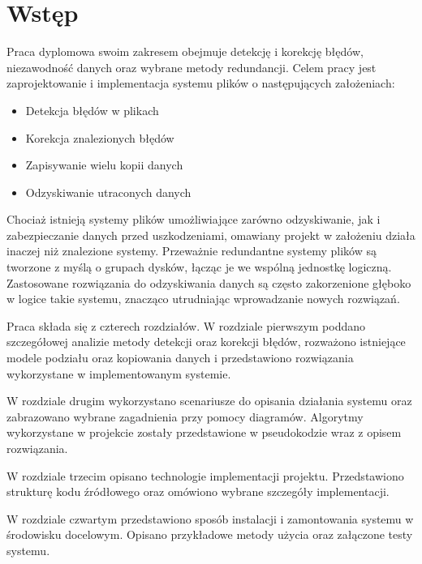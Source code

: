 \chapter{Wstęp}
\thispagestyle{chapterBeginStyle}

Praca dyplomowa swoim zakresem obejmuje detekcję i korekcję błędów, niezawodność danych oraz wybrane metody redundancji. Celem pracy jest zaprojektowanie i implementacja systemu plików o następujących założeniach:
\begin{itemize}
    \item Detekcja błędów w plikach
    \item Korekcja znalezionych błędów
    \item Zapisywanie wielu kopii danych
    \item Odzyskiwanie utraconych danych 
\end{itemize}

Chociaż istnieją systemy plików umożliwiające zarówno odzyskiwanie, jak i zabezpieczanie danych przed uszkodzeniami\cite{Java}, omawiany projekt w założeniu działa inaczej niż znalezione systemy. Przeważnie redundantne systemy plików są tworzone z myślą o grupach dysków, łącząc je we wspólną jednostkę logiczną. Zastosowane rozwiązania do odzyskiwania danych są często zakorzenione głęboko w logice takie systemu, znacząco utrudniając wprowadzanie nowych rozwiązań.

Praca składa się z czterech rozdziałów. W rozdziale pierwszym poddano szczegółowej analizie metody detekcji oraz korekcji błędów, rozważono istniejące modele podziału oraz kopiowania danych i przedstawiono rozwiązania wykorzystane w implementowanym systemie.

W rozdziale drugim wykorzystano scenariusze do opisania działania systemu oraz zabrazowano wybrane zagadnienia przy pomocy diagramów. Algorytmy wykorzystane w projekcie zostały przedstawione w pseudokodzie wraz z opisem rozwiązania.

W rozdziale trzecim opisano technologie implementacji projektu. Przedstawiono strukturę kodu źródłowego oraz omówiono wybrane szczegóły implementacji.

W rozdziale czwartym przedstawiono sposób instalacji i zamontowania systemu w środowisku docelowym. Opisano przykładowe metody użycia oraz załączone testy systemu.

